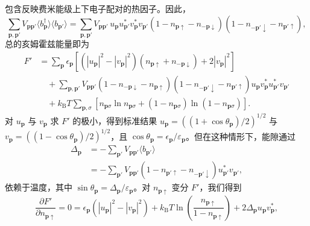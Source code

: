 包含反映费米能级上下电子配对的热因子。因此，
\begin{equation*}
\sum_{\mathbf{p},\mathbf{p}'}V_{\mathbf{p}\mathbf{p}'}\langle b_{\mathbf{p}}^{\dagger}\rangle\langle b_{\mathbf{p}'}\rangle=\sum_{\mathbf{p},\mathbf{p}'}V_{\mathbf{p}\mathbf{p}'}\,u_{\mathbf{p}}u_{\mathbf{p}'}^{*}v_{\mathbf{p}}^{*}v_{\mathbf{p}'}\left(1-n_{\mathbf{p}\uparrow}-n_{-\mathbf{p}\downarrow}\right)\left(1-n_{-\mathbf{p}'\downarrow}-n_{\mathbf{p}'\uparrow}\right),\tag{12.253}
\end{equation*}
总的亥姆霍兹能量即为
\begin{align*}
F'&=\sum_{\mathbf{p}}\epsilon_{\mathbf{p}}\left[\left(\left|u_{\mathbf{p}}\right|^{2}-\left|v_{\mathbf{p}}\right|^{2}\right)\left(n_{\mathbf{p}\uparrow}+n_{-\mathbf{p}\downarrow}\right)+2\left|v_{\mathbf{p}}\right|^{2}\right]\\
&\quad+\sum_{\mathbf{p},\mathbf{p}'}V_{\mathbf{p}\mathbf{p}'}\left(1-n_{-\mathbf{p}\downarrow}-n_{\mathbf{p}\uparrow}\right)\left(1-n_{-\mathbf{p}'\downarrow}-n_{\mathbf{p}'\uparrow}\right)u_{\mathbf{p}}v_{\mathbf{p}}^{*}u_{\mathbf{p}'}^{*}v_{\mathbf{p}'}\\
&\quad+k_{\mathrm{B}}T\sum_{\mathbf{p},\sigma}\left[n_{\mathbf{p}\sigma}\ln n_{\mathbf{p}\sigma}+\left(1-n_{\mathbf{p}\sigma}\right)\ln\left(1-n_{\mathbf{p}\sigma}\right)\right].\tag{12.254}
\end{align*}
对 $u_{\mathbf{p}}$ 与 $v_{\mathbf{p}}$ 求 $F'$ 的极小，得到标准结果 $u_{\mathbf{p}}=\left(\left(1+\cos\theta_{\mathbf{p}}\right)/2\right)^{1/2}$ 与 $v_{\mathbf{p}}=\left(\left(1-\cos\theta_{\mathbf{p}}\right)/2\right)^{1/2}$，且 $\cos\theta_{\mathbf{p}}=\epsilon_{\mathbf{p}}/\varepsilon_{\mathbf{p}}$。但在这种情形下，能隙通过
\begin{align*}
\Delta_{\mathbf{p}}&=-\sum_{\mathbf{p}'}V_{\mathbf{p}\mathbf{p}'}\langle b_{\mathbf{p}'}\rangle\\
&=-\sum_{\mathbf{p}'}V_{\mathbf{p}\mathbf{p}'}\left(1-n_{\mathbf{p}'\uparrow}-n_{-\mathbf{p}'\downarrow}\right)u_{\mathbf{p}'}^{*}v_{\mathbf{p}'},\tag{12.255}
\end{align*}
依赖于温度，其中 $\sin\theta_{\mathbf{p}}=\Delta_{\mathbf{p}}/\varepsilon_{\mathbf{p}}$。对 $n_{\mathbf{p}\uparrow}$ 变分 $F'$，我们得到
\begin{equation*}
\frac{\partial F'}{\partial n_{\mathbf{p}\uparrow}}=0=\epsilon_{\mathbf{p}}\left(\left|u_{\mathbf{p}}\right|^{2}-\left|v_{\mathbf{p}}\right|^{2}\right)+k_{\mathrm{B}}T\ln\left(\frac{n_{\mathbf{p}\uparrow}}{1-n_{\mathbf{p}\uparrow}}\right)+2\Delta_{\mathbf{p}}u_{\mathbf{p}}v_{\mathbf{p}}^{*},\tag{12.256}
\end{equation*}
